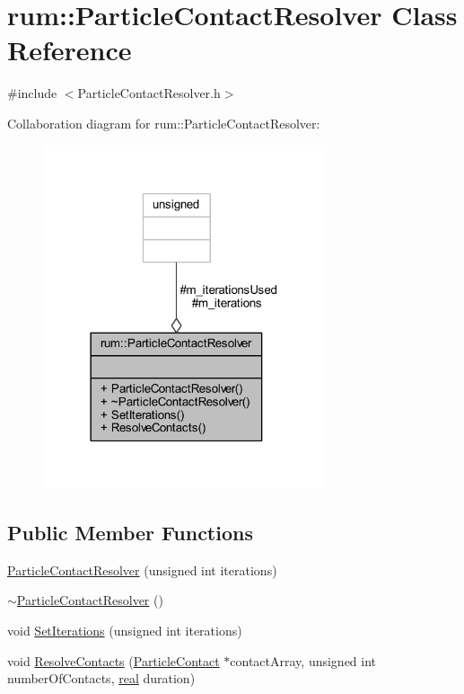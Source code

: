 \hypertarget{classrum_1_1_particle_contact_resolver}{}\section{rum\+:\+:Particle\+Contact\+Resolver Class Reference}
\label{classrum_1_1_particle_contact_resolver}


{\ttfamily \#include $<$Particle\+Contact\+Resolver.\+h$>$}



Collaboration diagram for rum\+:\+:Particle\+Contact\+Resolver\+:\nopagebreak
\begin{figure}[H]
\begin{center}
\leavevmode
\includegraphics[width=237pt]{classrum_1_1_particle_contact_resolver__coll__graph}
\end{center}
\end{figure}
\subsection*{Public Member Functions}
\begin{DoxyCompactItemize}
\item 
\hyperlink{classrum_1_1_particle_contact_resolver_a1921a5520c8940065d04f3bb890680bc}{Particle\+Contact\+Resolver} (unsigned int iterations)
\item 
\hyperlink{classrum_1_1_particle_contact_resolver_aa87e6c4d5a737b9882969350c99505b9}{$\sim$\+Particle\+Contact\+Resolver} ()
\item 
void \hyperlink{classrum_1_1_particle_contact_resolver_a9c5bb363df9e5c0948908c529b0bf04f}{Set\+Iterations} (unsigned int iterations)
\item 
void \hyperlink{classrum_1_1_particle_contact_resolver_af856a5ea476d4fd4383a44eee6a1045b}{Resolve\+Contacts} (\hyperlink{classrum_1_1_particle_contact}{Particle\+Contact} $\ast$contact\+Array, unsigned int number\+Of\+Contacts, \hyperlink{namespacerum_a7e8cca23573d5eaead0f138cbaa4862c}{real} duration)
\end{DoxyCompactItemize}
